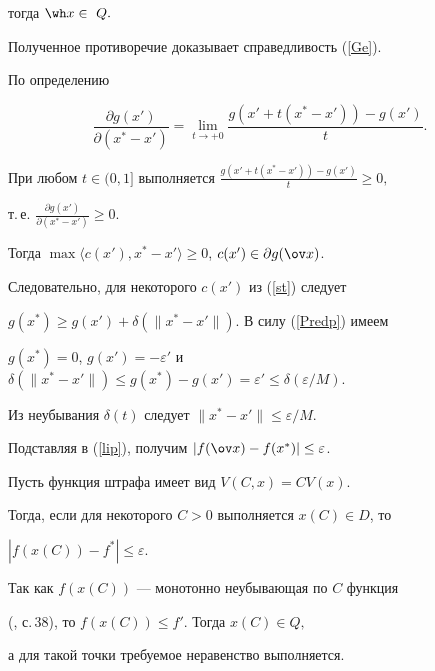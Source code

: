 \begin{pf}
тогда $\wh x\in\ Q.$ 


Полученное противоречие доказывает справедливость (\ref{Ge}).





По определению 


$$


\frac{\partial g(x')}{\partial (x^*-x')}=


\lim_{t \to +0}\frac{g(x'+t(x^*-x'))-g(x')}{t}.


$$


При любом $t\in(0,1]$ выполняется $\frac{g(x'+t(x^*-x'))-g(x')}{t}\geq 0,$


т.\,е. $\frac{\partial g(x')}{\partial(x^*-x')}\geq 0$.


Тогда $\max\langle c(x'),x^*-x'\rangle\geq 0$, $c(x')\in\partial g(\ov x)$. 


Следовательно, для некоторого $c(x')$ из (\ref{st}) следует


$g(x^*)\geq g(x')+\delta(\|x^*-x'\|)$. В силу (\ref{Predp}) имеем 


$g(x^*)=0$, $g(x')=-\varepsilon'$ и $\delta(\|x^*-x'\|)\leq g(x^*)-g(x')=


\varepsilon'\leq\delta(\varepsilon/M).$


Из неубывания $\delta(t)$ следует $\|x^*-x'\|\leq\varepsilon/M.$


Подставляя в (\ref{lip}), получим $|f(\ov x)-f(x^*)|\leq\varepsilon$. 


\end{pf}





\begin{cornonum}


Пусть функция штрафа имеет вид $V(C,x)=C V(x)$. 


Тогда, если для некоторого $C>0$ выполняется $x(C)\in D$, то 


$|f(x(C))-f^*|\leq\varepsilon$.


\end{cornonum}





\begin{pf}


Так как $f(x(C))$ --- монотонно неубывающая по $C$ функция


(\cite{Fed}, с.\,38), то $f(x(C))\leq f'$. Тогда $x(C)\in Q,$


а для такой точки требуемое неравенство выполняется. 


\end{pf}





